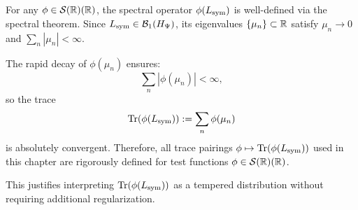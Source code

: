 \begin{remark}
\label{rem:functional_calculus_trace}
For any \( \phi \in \mathcal{S}(\mathbb{R})(\mathbb{R}) \), the spectral operator \( \phi(L_{\mathrm{sym}}) \) is well-defined via the spectral theorem. Since \( L_{\mathrm{sym}} \in \mathcal{B}_1(H_{\Psi}) \), its eigenvalues \( \{ \mu_n \} \subset \mathbb{R} \) satisfy \( \mu_n \to 0 \) and \( \sum_n |\mu_n| < \infty \).

The rapid decay of \( \phi(\mu_n) \) ensures:
\[
\sum_n |\phi(\mu_n)| < \infty,
\]
so the trace
\[
\operatorname{Tr}(\phi(L_{\mathrm{sym}})) := \sum_n \phi(\mu_n)
\]
is absolutely convergent. Therefore, all trace pairings \( \phi \mapsto \operatorname{Tr}(\phi(L_{\mathrm{sym}})) \) used in this chapter are rigorously defined for test functions \( \phi \in \mathcal{S}(\mathbb{R})(\mathbb{R}) \).

This justifies interpreting \( \operatorname{Tr}(\phi(L_{\mathrm{sym}})) \) as a tempered distribution without requiring additional regularization.
\end{remark}
